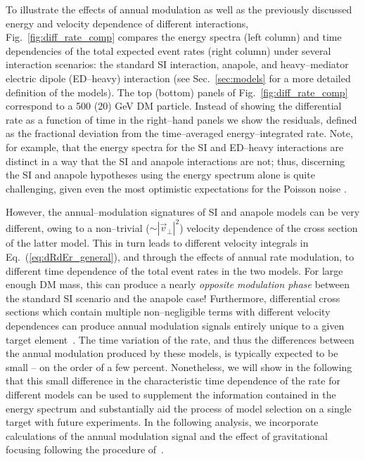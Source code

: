 \documentclass[11pt]{article}
\newcommand{\Eq}[1]{Eq.~(\ref{#1})} \newcommand{\Eqs}[2]{Eqs.~(\ref{#1}) and (\ref{#2})} \newcommand{\Eqm}[2]{Eqs.~(\ref{#1}) through (\ref{#2})}
\newcommand{\Sec}[1]{Sec.~\ref{#1}} \newcommand{\Secs}[2]{Secs.~\ref{#1} and \ref{#2}} \newcommand{\Secm}[2]{Secs.~\ref{#1} through \ref{#2}}
\newcommand{\Fig}[1]{Fig.~\ref{#1}} \newcommand{\Figs}[2]{Figs.~\ref{#1} and \ref{#2}}
\begin{document}
To illustrate the effects of annual modulation as well as the previously discussed energy and velocity dependence of different interactions, \Fig{fig:diff_rate_comp} compares the energy spectra (left column) and time dependencies of the total expected event rates (right column) under several interaction scenarios: the standard SI interaction, anapole, and heavy--mediator electric dipole (ED--heavy) interaction (see \Sec{sec:models} for a more detailed definition of the models). The top (bottom) panels of \Fig{fig:diff_rate_comp} correspond to a 500 (20) GeV DM particle.  Instead of showing the differential rate as a function of time in the right--hand panels we show the residuals, defined as the fractional deviation from the time--averaged energy--integrated rate. Note, for example, that the energy spectra for the SI and ED--heavy interactions are distinct in a way that the SI and anapole interactions are not; thus, discerning the SI and anapole hypotheses using the energy spectrum alone is quite challenging, given even the most optimistic expectations for the Poisson noise \cite{Gluscevic:2015sqa}. 

However, the annual--modulation signatures of SI and anapole models can be very different, owing to a non--trivial ($\sim | \vec v_\perp|^2$) velocity dependence of the cross section of the latter model. This in turn leads to different velocity integrals in \Eq{eq:dRdEr_general}, and through the effects of annual rate modulation, to different time dependence of the total event rates in the two models. For large enough DM mass, this can produce a nearly {\it opposite modulation phase} between the standard SI scenario and the anapole case! Furthermore, differential cross sections which contain multiple non--negligible terms with different velocity dependences can produce annual modulation signals entirely unique to a given target element~\cite{DelNobile:2015tza,DelNobile:2015rmp}. The time variation of the rate, and thus the differences between the annual modulation produced by these models, is typically expected to be small -- on the order of a few percent. Nonetheless, we will show in the following that this small difference in the characteristic time dependence of the rate for different models can be used to supplement the information contained in the energy spectrum and substantially aid the process of model selection on a single target with future experiments. In the following analysis, we incorporate calculations of the annual modulation signal and the effect of gravitational focusing following the procedure of~\cite{Lee:2013wza}. 
\end{document}
